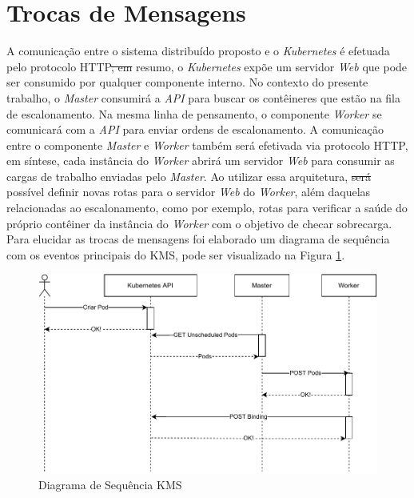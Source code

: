 \documentclass[
	12pt,				%
	openright,			%
	oneside,			%
	a4paper,			%
	brazil				%
	]{abntex2}
\providecommand{\DIFaddtex}[1]{{\protect\color{blue}\uwave{#1}}} %
\providecommand{\DIFdeltex}[1]{{\protect\color{red}\sout{#1}}}                      %
\providecommand{\DIFaddbegin}{} %
\providecommand{\DIFaddend}{} %
\providecommand{\DIFdelbegin}{} %
\providecommand{\DIFdelend}{} %
\providecommand{\DIFadd}[1]{\texorpdfstring{\DIFaddtex{#1}}{#1}} %
\providecommand{\DIFdel}[1]{\texorpdfstring{\DIFdeltex{#1}}{}} %
\newcommand{\DIFscaledelfig}{0.5}
\newlength{\DIFdelgraphicswidth} %
\newlength{\DIFdelgraphicsheight} %
\newcommand{\DIFaddincludegraphics}[2][]{{\color{blue}\fbox{\DIFOincludegraphics[#1]{#2}}}} %
\newcommand{\DIFdelincludegraphics}[2][]{%
\sbox{\DIFdelgraphicsbox}{\DIFOincludegraphics[#1]{#2}}%
\settoboxwidth{\DIFdelgraphicswidth}{\DIFdelgraphicsbox} %
\settoboxtotalheight{\DIFdelgraphicsheight}{\DIFdelgraphicsbox} %
\scalebox{\DIFscaledelfig}{%
\parbox[b]{\DIFdelgraphicswidth}{\usebox{\DIFdelgraphicsbox}\\[-\baselineskip] \rule{\DIFdelgraphicswidth}{0em}}\llap{\resizebox{\DIFdelgraphicswidth}{\DIFdelgraphicsheight}{%
\setlength{\unitlength}{\DIFdelgraphicswidth}%
\begin{picture}(1,1)%
\thicklines\linethickness{2pt} %
{\color[rgb]{1,0,0}\put(0,0){\framebox(1,1){}}}%
{\color[rgb]{1,0,0}\put(0,0){\line( 1,1){1}}}%
{\color[rgb]{1,0,0}\put(0,1){\line(1,-1){1}}}%
\end{picture}%
}\hspace*{3pt}}} %
} %
\DeclareRobustCommand{\DIFaddbegin}{\DIFOaddbegin \let\includegraphics\DIFaddincludegraphics} %
\DeclareRobustCommand{\DIFaddend}{\DIFOaddend \let\includegraphics\DIFOincludegraphics} %
\DeclareRobustCommand{\DIFdelbegin}{\DIFOdelbegin \let\includegraphics\DIFdelincludegraphics} %
\DeclareRobustCommand{\DIFdelend}{\DIFOaddend \let\includegraphics\DIFOincludegraphics} %
\begin{document}
\section{Trocas de Mensagens}

A comunicação entre o sistema distribuído proposto e o \textit{Kubernetes} é efetuada pelo protocolo \ac{HTTP}\DIFdelbegin \DIFdel{, em }\DIFdelend \DIFaddbegin \DIFadd{.
Em }\DIFaddend resumo, o \textit{Kubernetes} expõe um servidor \textit{Web} que pode ser consumido por qualquer componente interno. No contexto do presente trabalho, o \textit{Master} consumirá a \textit{API} para buscar os contêineres que estão na fila de escalonamento. Na mesma linha de pensamento, o componente \textit{Worker} se comunicará com a \textit{API} para enviar ordens de escalonamento. A comunicação entre o componente \textit{Master} e \textit{Worker} também será efetivada via protocolo \ac{HTTP}, em síntese, cada instância do \textit{Worker} abrirá um servidor \textit{Web} para consumir as cargas de trabalho enviadas pelo \textit{Master}. Ao utilizar essa arquitetura, \DIFdelbegin \DIFdel{será }\DIFdelend \DIFaddbegin \DIFadd{é }\DIFaddend possível definir novas rotas para o servidor \textit{Web} do \textit{Worker}, além daquelas relacionadas ao escalonamento, como por exemplo, rotas para verificar a saúde do próprio contêiner da instância do \textit{Worker} com o objetivo de checar sobrecarga. Para elucidar as trocas de mensagens foi elaborado um diagrama de sequência com os eventos principais do \ac{KMS}, pode ser visualizado na Figura \ref{fig:sequencia}. 

\begin{figure}[h!]
	\caption{\label{fig:sequencia}Diagrama de Sequência \ac{KMS}}
	\centering
	\includegraphics[width=\linewidth]{assets/sequencia.pdf}
\end{figure}
\end{document}
